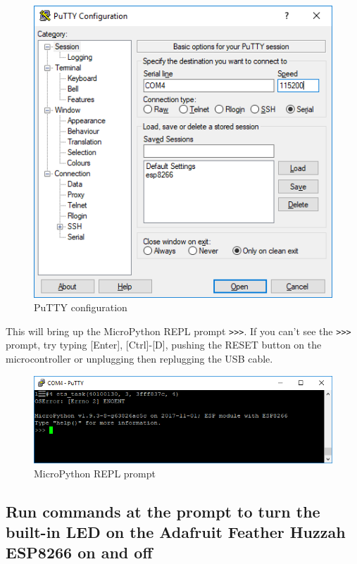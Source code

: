 \documentclass{book}
\makeatletter
\def\maxwidth{\ifdim\Gin@nat@width>\linewidth\linewidth
    \else\Gin@nat@width\fi}
\let\Oldincludegraphics\includegraphics
\renewcommand{\includegraphics}[1]{\Oldincludegraphics[width=.8\maxwidth]{#1}}
\makeatother
\begin{document}
\begin{figure}
\centering
\includegraphics{images/putty_config.PNG}
\caption{PuTTY configuration}
\end{figure}

This will bring up the MicroPython REPL prompt \lstinline!>>>!. If you
can't see the \lstinline!>>>! prompt, try typing {[}Enter{]},
{[}Ctrl{]}-{[}D{]}, pushing the RESET button on the microcontroller or
unplugging then replugging the USB cable.

\begin{figure}
\centering
\includegraphics{images/REPL_prompt.PNG}
\caption{MicroPython REPL prompt}
\end{figure}
    




    
        \subsection{Run commands at the prompt to turn the built-in LED on the
Adafruit Feather Huzzah ESP8266 on and
off}\label{run-commands-at-the-prompt-to-turn-the-built-in-led-on-the-adafruit-feather-huzzah-esp8266-on-and-off}
    
\end{document}
